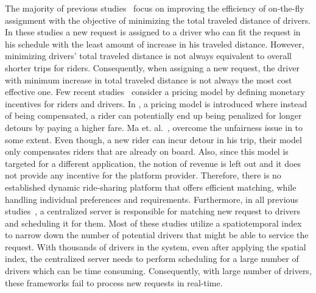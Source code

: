 The majority of previous studies~\cite{Ota15, Cici15, Cao15, PelzerITS15} focus on improving the efficiency of on-the-fly assignment with the objective of minimizing the total traveled distance of drivers. In these studies a new request is assigned to a driver who can fit the request in his schedule with the least amount of increase in his traveled distance. However, minimizing drivers' total traveled distance is not always equivalent to overall shorter trips for riders. Consequently, when assigning a new request, the driver with minimum increase in total traveled distance is not always the most cost effective one. Few recent studies~\cite{Ma13,Ma15} consider a pricing model by defining monetary incentives for riders and drivers. In \cite{Ma13}, a pricing model is introduced where instead of being compensated, a rider can potentially end up being penalized for longer detours by paying a higher fare. Ma et. al.~\cite{Ma15}, overcome the unfairness issue in \cite{Ma13} to some extent. Even though, a new rider can incur detour in his trip, their model only compensates riders that are already on board. Also, since this model is targeted for a different application, the notion of revenue is left out and it does not provide any incentive for the platform provider. Therefore, there is no established dynamic ride-sharing platform that offers efficient matching, while handling individual preferences and requirements. Furthermore, in all previous studies~\cite{Ma13,Huang14,Ma15}, a centralized server is responsible for matching new request to drivers and scheduling it for them. Most of these studies utilize a spatiotemporal index to narrow down the number of potential drivers that might be able to service the request. With thousands of drivers in the system, even after applying the spatial index, the centralized server needs to perform scheduling for a large number of drivers which can be time consuming. Consequently, with large number of drivers, these frameworks fail to process new requests in real-time.




